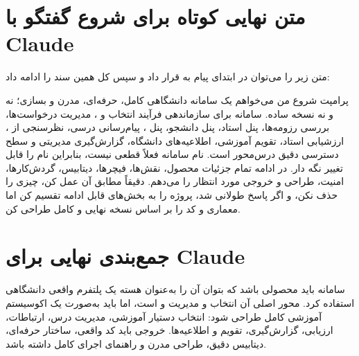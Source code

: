 \documentclass[12pt,a4paper]{article}
\begin{document}
\section{متن نهایی کوتاه برای شروع گفتگو با Claude}
متن زیر را می‌توان در ابتدای پیام به  قرار داد و سپس کل همین سند را ادامه داد:

\begin{importantbox}{پرامپت شروع}
من می‌خواهم یک سامانه دانشگاهی کامل، حرفه‌ای، مدرن و  بسازی؛ نه  و نه نسخه ساده. سامانه برای سازماندهی فرآیند انتخاب  و ، مدیریت درخواست‌ها، بررسی رزومه‌ها، پنل استاد، پنل دانشجو، پنل ، پیام‌رسانی درسی، نظرسنجی از ، ارزشیابی استاد، تقویم آموزشی، اطلاعیه‌های دانشگاه، گزارش‌گیری مدیریتی و سطح دسترسی دقیق درس‌محور است. نام سامانه فعلاً قطعی نیست، بنابراین نام را قابل تغییر نگه دار. در ادامه تمام جزئیات محصول، نقش‌ها، فیچرها، دیتابیس، گردش‌کارها، امنیت، طراحی و خروجی مورد انتظار را می‌دهم. دقیقاً مطابق آن عمل کن، چیزی را حذف نکن، و اگر پاسخ طولانی شد، پروژه را به بخش‌های قابل ادامه تقسیم کن اما معماری و کد را بر اساس نسخه نهایی و کامل طراحی کن.
\end{importantbox}

\section{جمع‌بندی نهایی برای Claude}
سامانه باید محصولی باشد که بتوان آن را به‌عنوان هسته یک پلتفرم واقعی دانشگاهی استفاده کرد. محور اصلی آن انتخاب و مدیریت  و  است، اما باید به‌صورت یک اکوسیستم آموزشی کامل طراحی شود: انتخاب دستیار آموزشی، مدیریت درس، ارتباطات، ارزیابی، گزارش‌گیری، تقویم و اطلاعیه‌ها. خروجی باید کد واقعی، ساختار حرفه‌ای، دیتابیس دقیق، طراحی مدرن و راهنمای اجرای کامل داشته باشد.
\end{document}
